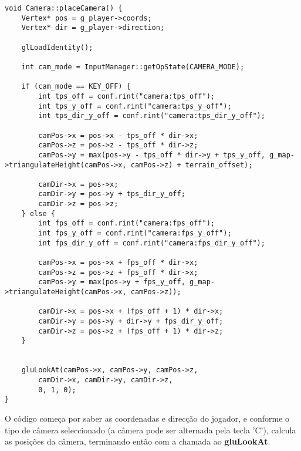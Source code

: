 \begin{lstlisting}[caption=Função de posicionamento da câmera]
void Camera::placeCamera() {
	Vertex* pos = g_player->coords;
	Vertex* dir = g_player->direction;

	glLoadIdentity();

	int cam_mode = InputManager::getOpState(CAMERA_MODE);

	if (cam_mode == KEY_OFF) {
		int tps_off = conf.rint("camera:tps_off");
		int tps_y_off = conf.rint("camera:tps_y_off");
		int tps_dir_y_off = conf.rint("camera:tps_dir_y_off");

		camPos->x = pos->x - tps_off * dir->x;
		camPos->z = pos->z - tps_off * dir->z;
		camPos->y = max(pos->y - tps_off * dir->y + tps_y_off, g_map->triangulateHeight(camPos->x, camPos->z) + terrain_offset);

		camDir->x = pos->x;
		camDir->y = pos->y + tps_dir_y_off;
		camDir->z = pos->z;
	} else {
		int fps_off = conf.rint("camera:fps_off");
		int fps_y_off = conf.rint("camera:fps_y_off");
		int fps_dir_y_off = conf.rint("camera:fps_dir_y_off");

		camPos->x = pos->x + fps_off * dir->x;
		camPos->z = pos->z + fps_off * dir->x;
		camPos->y = max(pos->y + fps_y_off, g_map->triangulateHeight(camPos->x, camPos->z));

		camDir->x = pos->x + (fps_off + 1) * dir->x;
		camDir->y = pos->y + dir->y + fps_dir_y_off;
		camDir->z = pos->z + (fps_off + 1) * dir->z;
	}


	gluLookAt(camPos->x, camPos->y, camPos->z,
		camDir->x, camDir->y, camDir->z,
		0, 1, 0);
}

\end{lstlisting} 

O código começa por saber as coordenadas e direcção do jogador, e conforme o tipo de câmera seleccionado (a câmera pode ser alternada pela tecla 'C'), calcula as posições da câmera, terminando então com a chamada ao \textbf{gluLookAt}.
